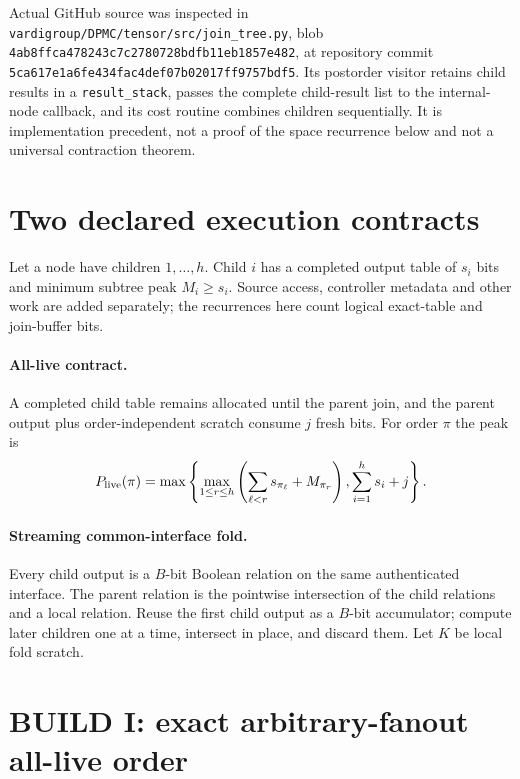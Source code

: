 \documentclass[11pt]{article}
\begin{document}
Actual GitHub source was inspected in
\texttt{vardigroup/DPMC/tensor/src/join\_tree.py}, blob
\texttt{4ab8ffca478243c7c2780728bdfb11eb1857e482}, at repository commit
\texttt{5ca617e1a6fe434fac4def07b02017ff9757bdf5}.  Its postorder visitor retains child results in a
\texttt{result\_stack}, passes the complete child-result list to the internal-node callback, and its
cost routine combines children sequentially.  It is implementation precedent, not a proof of the
space recurrence below and not a universal contraction theorem.

\section{Two declared execution contracts}

Let a node have children $1,\dots,h$.  Child $i$ has a completed output table of $s_i$ bits and
minimum subtree peak $M_i\ge s_i$.  Source access, controller metadata and other work are added
separately; the recurrences here count logical exact-table and join-buffer bits.

\paragraph{All-live contract.} A completed child table remains allocated until the parent join, and
the parent output plus order-independent scratch consume $j$ fresh bits.  For order $\pi$ the peak is
\begin{equation}
 P_{\rm live}(\pi)=\max\left\{
 \max_{1\le r\le h}\left(\sum_{\ell<r}s_{\pi_\ell}+M_{\pi_r}\right),
 \sum_{i=1}^h s_i+j\right\}.
 \label{eq:live}
\end{equation}

\paragraph{Streaming common-interface fold.} Every child output is a $B$-bit Boolean relation on the
same authenticated interface.  The parent relation is the pointwise intersection of the child
relations and a local relation.  Reuse the first child output as a $B$-bit accumulator; compute later
children one at a time, intersect in place, and discard them.  Let $K$ be local fold scratch.

\section{BUILD I: exact arbitrary-fanout all-live order}
\end{document}
